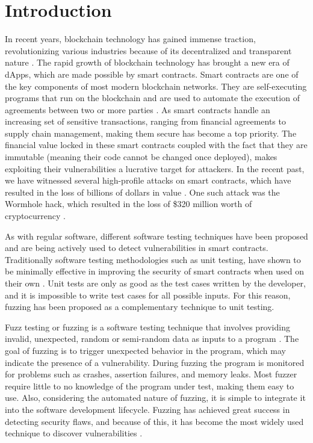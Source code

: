
\chapter{Introduction}\label{chapter:introduction}
In recent years, blockchain technology has gained immense traction, revolutionizing various industries because of its decentralized and transparent nature \cite{noauthor_global_nodate}.
The rapid growth of blockchain technology has brought a new era of \acp{dApp}, which are made possible by smart contracts.
Smart contracts are one of the key components of most modern blockchain networks.
They are self-executing programs that run on the blockchain and are used to automate the execution of agreements between two or more parties \cite{zou_smart_2021}.
As smart contracts handle an increasing set of sensitive transactions, ranging from financial agreements to supply chain management, making them secure has become a top priority.
The financial value locked in these smart contracts coupled with the fact that they are immutable (meaning their code cannot be changed once deployed), makes exploiting their vulnerabilities a lucrative target for attackers.
In the recent past, we have witnessed several high-profile attacks on smart contracts, which have resulted in the loss of billions of dollars in value  \cite{noauthor_funds_nodate}.
One such attack was the Wormhole hack, which resulted in the loss of \$320 million worth of cryptocurrency \cite{faife_wormhole_2022}.

As with regular software, different software testing techniques have been proposed and are being actively used to detect vulnerabilities in smart contracts.
Traditionally software testing methodologies such as unit testing, have shown to be minimally effective in improving the security of smart contracts when used on their own \cite{noauthor_smart_nodate}.
Unit tests are only as good as the test cases written by the developer, and it is impossible to write test cases for all possible inputs.
For this reason, fuzzing has been proposed as a complementary technique to unit testing.

Fuzz testing or fuzzing is a software testing technique that involves providing invalid, unexpected, random or semi-random data as inputs to a program \cite{manes_art_2019}.
The goal of fuzzing is to trigger unexpected behavior in the program, which may indicate the presence of a vulnerability.
During fuzzing the program is monitored for problems such as crashes, assertion failures, and memory leaks.
Most fuzzer require little to no knowledge of the program under test, making them easy to use.
Also, considering the automated nature of fuzzing, it is simple to integrate it into the software development lifecycle.
Fuzzing has achieved great success in detecting security flaws, and because of this, it has become the most widely used technique to discover vulnerabilities \cite{li_fuzzing_2018, zhu_fuzzing_2022}.

